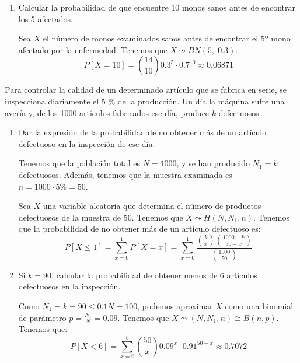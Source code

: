 \begin{ejercicio}
\begin{enumerate}
        \item Calcular la probabilidad de que encuentre 10 monos sanos antes de encontrar los 5 afectados.

        Sea $X$ el número de monos examinados sanos antes de encontrar el 5º mono afectado por la enfermedad. Tenemos que $X\leadsto BN(5,\;0.3)$.
        \begin{equation*}
            P[X=10] = \binom{14}{10}0.3^{5}\cdot 0.7^{10} \approx0.06871
        \end{equation*}
    \end{enumerate}
\end{ejercicio}


\begin{ejercicio}
    Para controlar la calidad de un determinado artículo que se fabrica en serie, se inspecciona diariamente el 5 \% de la producción. Un día la máquina sufre una avería y, de los 1000 artículos fabricados ese día, produce $k$ defectuosos.
    \begin{enumerate}
        \item Dar la expresión de la probabilidad de no obtener más de un artículo defectuoso en la inspección de ese día.

        

        Tenemos que la población total es $N=1000$, y se han producido $N_1=k$ defectuosos. Además, tenemos que la muestra examinada es $n=1000\cdot 5\% = 50$.

        Sea $X$ una variable aleatoria que determina el número de productos defectuosos de la muestra de 50. Tenemos que $X\leadsto H(N,N_1,n)$. Tenemos que la probabilidad de no obtener más de un artículo defectuoso es:
        \begin{equation*}
            P[X\leq 1]=\sum_{x=0}^1 P[X=x] = \sum_{x=0}^1 \frac{\binom{k}{x}\binom{1000-k}{50-x}}{\binom{1000}{50}}
        \end{equation*}
        
        \item Si $k = 90$, calcular la probabilidad de obtener menos de 6 artículos defectuosos en la inspección.

        Como $N_1=k=90\leq 0.1N=100$, podemos aproximar $X$ como una binomial de parámetro $p=\frac{N_1}{N}=0.09$. Tenemos que $X\leadsto (N,N_1,n)\cong B(n,p)$. Tenemos que:
        \begin{equation*}
            P[X< 6]=\sum_{x=0}^5 \binom{50}{x}0.09^x\cdot 0.91^{50-x} \approx 0.7072
        \end{equation*}
    \end{enumerate}
\end{ejercicio}


